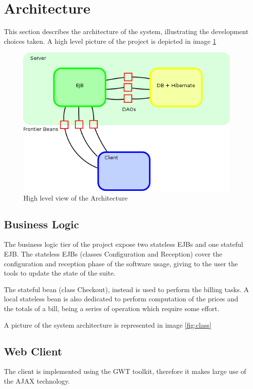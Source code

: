 \documentclass [11pt]{article}
\begin{document}
\section{Architecture}
This section describes the architecture of the system, illustrating the
development choices taken. A high level picture of the project is depicted
in image \ref{fig:arch}

\begin{figure}[h]
\includegraphics[width=\textwidth]{images/arch.png}
\caption {High level view of the Architecture}
\label {fig:arch}
\end{figure}

\subsection{Business Logic}
The business logic tier of the project expose two stateless EJBs and one
stateful EJB. The stateless EJBs (classes Configuration and Reception) cover the configuration and reception
phase of the software usage, giving to the user the tools to update the
state of the suite.

The stateful bean (class Checkout), instead is used to perform the billing tasks.
A local stateless bean is also dedicated to perform computation of the prices
and the totals of a bill, being a series of operation which require some
effort.

A picture of the system architecture is represented in image
\ref{fig:class}

\subsection{Web Client}
The client is implemented using the GWT toolkit, therefore it makes large
use of the AJAX technology.
\end{document}
